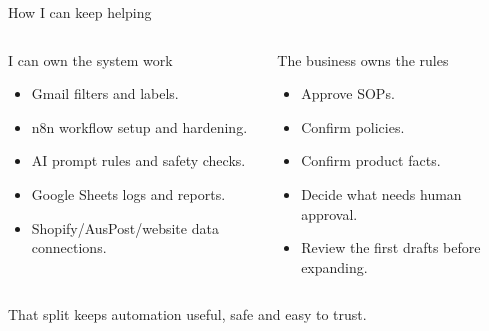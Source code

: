 \documentclass[aspectratio=169,11pt]{beamer}
\begin{document}
\begin{frame}{How I can keep helping}
  \vspace{0.2cm}
  \begin{columns}[T,onlytextwidth]
      \begin{block}{I can own the system work}
        \begin{itemize}\setlength\itemsep{0.35em}
          \item Gmail filters and labels.
          \item n8n workflow setup and hardening.
          \item AI prompt rules and safety checks.
          \item Google Sheets logs and reports.
          \item Shopify/AusPost/website data connections.
        \end{itemize}
      \end{block}
      \begin{block}{The business owns the rules}
        \begin{itemize}\setlength\itemsep{0.35em}
          \item Approve SOPs.
          \item Confirm policies.
          \item Confirm product facts.
          \item Decide what needs human approval.
          \item Review the first drafts before expanding.
        \end{itemize}
      \end{block}
  \end{columns}
  \vspace{0.3cm}
  \begin{center}\small\textcolor{muted}{That split keeps automation useful, safe and easy to trust.}\end{center}
\end{frame}
\end{document}
